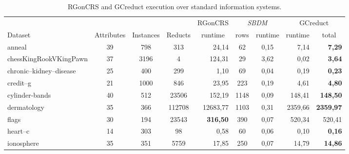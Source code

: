 \documentclass[authoryear,preprint,review,12pt]{elsarticle}
\begin{document}
	\begin{table}[!htb]
		\setlength{\tabcolsep}{3pt}
		\caption{RGonCRS and GCreduct execution over standard information systems.}\label{tab:matlab}
		\centering \scriptsize
		\begin{tabular}{|l|c|c|c|r|c|c|r|r|}
			\hline
			&&&& RGonCRS & \multicolumn{2}{c|}{\textit{SBDM}} & \multicolumn{2}{c|}{GCreduct}\\ %
			\cline{6-9}
			Dataset & Attributes & Instances & Reducts & \multicolumn{1}{c|}{runtime} & rows & runtime & \multicolumn{1}{c|}{runtime} & \multicolumn{1}{c|}{total} \\ %
			\hline
			anneal	& 39 & 798 & 313 & 24,14 & 62 & 0,15 & 7,14 & \textbf{7,29} \\ %
			chessKingRookVKingPawn & 37 & 3196 & 4 & 124,31 & 29 & 3,62 & 0,02 & \textbf{3,64}\\ %
			chronic--kidney--disease & 25 & 400 & 299 & 1,10 & 69 & 0,04 & 0,19 & \textbf{0,23} \\ %
			credit--g & 21 & 1000 & 846 & 23,95 & 223 & 0,19 & 4,61 & \textbf{4,80} \\ %
			cylinder-bands & 40 & 512 & 23506 & 152,19 & 1148 & 0,09 & 148,41 & \textbf{148,50}\\ %
			dermatology & 35 & 366 & 112708 & 12683,77 & 1103 & 0,31 & 2359,66 & \textbf{2359,97} \\ %
			flags & 30 & 194 & 23543 & \textbf{316,50} & 390 & 0,07 & 520,34 & 520,41 \\ %
			heart--c & 14 & 303 & 98 & 0,58 & 60 & 0,06 & 0,10 & \textbf{0,16}\\ %
			ionosphere & 35 & 351 & 5759 & 17,85 & 250 & 0,07 & 14,79 & \textbf{14,86}\\ %

\end{tabular}
\end{table}
\end{document}
